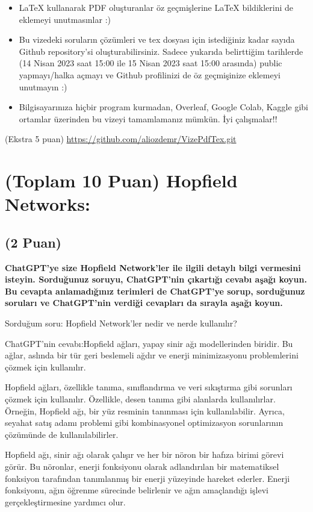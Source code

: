 \documentclass[11pt]{article}
\begin{document}
\begin{itemize}
    \item LaTeX kullanarak PDF oluşturanlar öz geçmişlerine LaTeX bildiklerini de eklemeyi unutmasınlar :)
    \item Bu vizedeki soruların çözümleri ve tex dosyası için istediğiniz kadar sayıda Github repository'si oluşturabilirsiniz. Sadece yukarıda belirttiğim tarihlerde (14 Nisan 2023 saat 15:00 ile 15 Nisan 2023 saat 15:00 arasında) public yapmayı/halka açmayı ve Github profilinizi de öz geçmişinize eklemeyi unutmayın :)
    \item Bilgisayarınıza hiçbir program kurmadan, Overleaf, Google Colab, Kaggle gibi ortamlar üzerinden bu vizeyi tamamlamanız mümkün. İyi çalışmalar!!
\end{itemize}

(Ekstra 5 puan) \url{https://github.com/aliozdemr/VizePdfTex.git}

\newpage
\section{(Toplam 10 Puan) Hopfield Networks:}

\subsection{(2 Puan)} \textbf{ChatGPT’ye size Hopfield Network’ler ile ilgili detaylı bilgi vermesini isteyin. Sorduğunuz soruyu, ChatGPT'nin çıkartığı cevabı aşağı koyun. Bu cevapta anlamadığınız terimleri de ChatGPT’ye sorup, sorduğunuz soruları ve ChatGPT’nin verdiği cevapları da sırayla aşağı koyun.}

\item Sorduğum soru: Hopfield Network’ler nedir ve nerde kullanılır?
\item ChatGPT'nin cevabı:Hopfield ağları, yapay sinir ağı modellerinden biridir. Bu ağlar, aslında bir tür geri beslemeli ağdır ve enerji minimizasyonu problemlerini çözmek için kullanılır.

Hopfield ağları, özellikle tanıma, sınıflandırma ve veri sıkıştırma gibi sorunları çözmek için kullanılır. Özellikle, desen tanıma gibi alanlarda kullanılırlar. Örneğin, Hopfield ağı, bir yüz resminin tanınması için kullanılabilir. Ayrıca, seyahat satış adamı problemi gibi kombinasyonel optimizasyon sorunlarının çözümünde de kullanılabilirler.

Hopfield ağı, sinir ağı olarak çalışır ve her bir nöron bir hafıza birimi görevi görür. Bu nöronlar, enerji fonksiyonu olarak adlandırılan bir matematiksel fonksiyon tarafından tanımlanmış bir enerji yüzeyinde hareket ederler. Enerji fonksiyonu, ağın öğrenme sürecinde belirlenir ve ağın amaçlandığı işlevi gerçekleştirmesine yardımcı olur.
\end{document}
